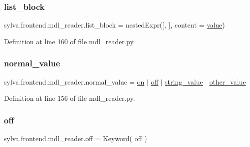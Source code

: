 \subsubsection{\texorpdfstring{list\+\_\+block}{list\_block}}
{\footnotesize\ttfamily sylva.\+frontend.\+mdl\+\_\+reader.\+list\+\_\+block = nested\+Expr(\textquotesingle{}\mbox{[}\textquotesingle{}, \textquotesingle{}\mbox{]}\textquotesingle{}, content = \hyperlink{namespacesylva_1_1frontend_1_1mdl__reader_a20dbd52811dc7d7916a801d1b8cc772e}{value})}



Definition at line 160 of file mdl\+\_\+reader.\+py.

\mbox{\label{namespacesylva_1_1frontend_1_1mdl__reader_a29a2a57aa15b95311fcc436d42ccc110}} 
\subsubsection{\texorpdfstring{normal\+\_\+value}{normal\_value}}
{\footnotesize\ttfamily sylva.\+frontend.\+mdl\+\_\+reader.\+normal\+\_\+value = \hyperlink{namespacesylva_1_1frontend_1_1mdl__reader_a8fb0a02ca237b01f23245c80760b4071}{on} $\vert$ \hyperlink{namespacesylva_1_1frontend_1_1mdl__reader_a26a83a8cd91347ea93b5b678c14baf7a}{off} $\vert$ \hyperlink{namespacesylva_1_1frontend_1_1mdl__reader_ab10130f0d0adc28ded718ac26c1abc5c}{string\+\_\+value} $\vert$ \hyperlink{namespacesylva_1_1frontend_1_1mdl__reader_a14e5f5e94df43c0c60a7f83c1d5a574e}{other\+\_\+value}}



Definition at line 156 of file mdl\+\_\+reader.\+py.

\mbox{\label{namespacesylva_1_1frontend_1_1mdl__reader_a26a83a8cd91347ea93b5b678c14baf7a}} 
\subsubsection{\texorpdfstring{off}{off}}
{\footnotesize\ttfamily sylva.\+frontend.\+mdl\+\_\+reader.\+off = Keyword( \textquotesingle{}off\textquotesingle{} )}



